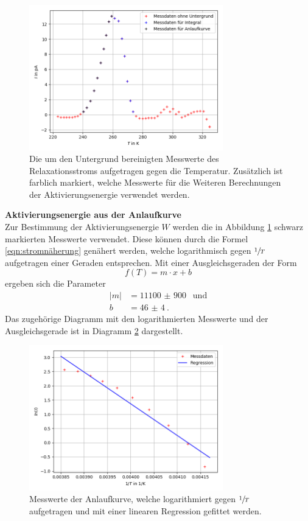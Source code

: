 \begin{figure}[H]
  \centering
  \includegraphics[width=0.75\textwidth]{Dipol1ohneUntergrund.png}
  \caption{Die um den Untergrund bereinigten Messwerte des Relaxationsstroms aufgetragen gegen die
  Temperatur. Zusätzlich ist farblich markiert, welche Messwerte für die Weiteren Berechnungen der Aktivierungsenergie
  verwendet werden.}
  \label{fig:Fig2}
\end{figure}


\textbf{Aktivierungsenergie aus der Anlaufkurve}\\
Zur Bestimmung der Aktivierungsenergie $W$ werden die in Abbildung \ref{fig:Fig2} schwarz
markierten Messwerte verwendet. Diese können durch die Formel \ref{eqn:stromnäherung} genähert werden,
welche logarithmisch gegen $\sfrac{1}{T}$ aufgetragen einer Geraden entsprechen. Mit einer
Ausgleichsgeraden der Form
\begin{equation}
  f(T)=m\cdot x+b
\end{equation}
ergeben sich die Parameter
\begin{align*}
  |m|&=\SI{11100(900)}{}\;\; \text{und}\\
  b&=\SI{46(4)}{}.
\end{align*}
Das zugehörige Diagramm mit den logarithmierten Messwerte und der Ausgleichsgerade ist in Diagramm \ref{fig:Fig3}
dargestellt.

\begin{figure}
  \centering
  \includegraphics[width=0.75\textwidth]{Dipol1Anlauf.png}
  \caption{Messwerte der Anlaufkurve, welche logarithmiert gegen $\sfrac{1}{T}$ aufgetragen und mit
  einer linearen Regression gefittet werden.}
  \label{fig:Fig3}
\end{figure}

